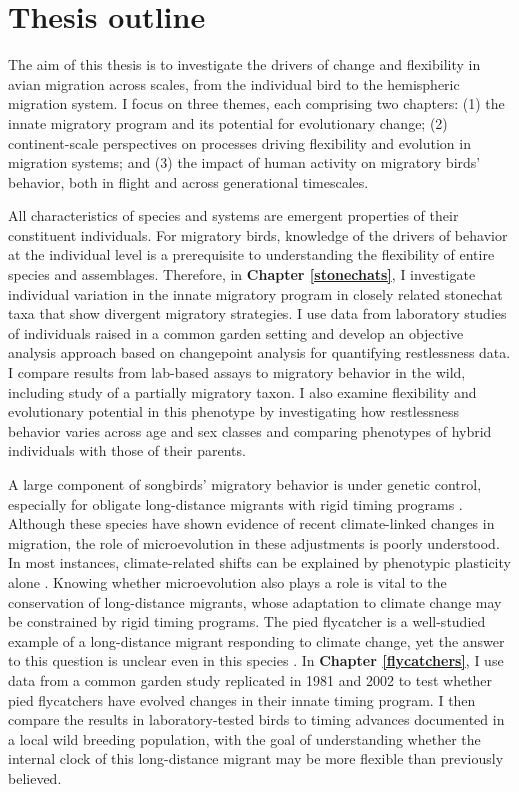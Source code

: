 \documentclass[a4paper, nobind]{templates/ociamthesis}
\begin{document}
\hypertarget{thesis-outline}{%
\section*{Thesis outline}\label{thesis-outline}}

The aim of this thesis is to investigate the drivers of change and flexibility in avian migration across scales, from the individual bird to the hemispheric migration system. I focus on three themes, each comprising two chapters: (1) the innate migratory program and its potential for evolutionary change; (2) continent-scale perspectives on processes driving flexibility and evolution in migration systems; and (3) the impact of human activity on migratory birds' behavior, both in flight and across generational timescales.

All characteristics of species and systems are emergent properties of their constituent individuals. For migratory birds, knowledge of the drivers of behavior at the individual level is a prerequisite to understanding the flexibility of entire species and assemblages. Therefore, in \textbf{Chapter \ref{stonechats}}, I investigate individual variation in the innate migratory program in closely related stonechat taxa that show divergent migratory strategies. I use data from laboratory studies of individuals raised in a common garden setting and develop an objective analysis approach based on changepoint analysis for quantifying restlessness data. I compare results from lab-based assays to migratory behavior in the wild, including study of a partially migratory taxon. I also examine flexibility and evolutionary potential in this phenotype by investigating how restlessness behavior varies across age and sex classes and comparing phenotypes of hybrid individuals with those of their parents.

A large component of songbirds' migratory behavior is under genetic control, especially for obligate long-distance migrants with rigid timing programs \autocite{liedvogelGeneticsMigration2014}. Although these species have shown evidence of recent climate-linked changes in migration, the role of microevolution in these adjustments is poorly understood. In most instances, climate-related shifts can be explained by phenotypic plasticity alone \autocite{charmantierClimateChangeTiming2014}. Knowing whether microevolution also plays a role is vital to the conservation of long-distance migrants, whose adaptation to climate change may be constrained by rigid timing programs. The pied flycatcher is a well-studied example of a long-distance migrant responding to climate change, yet the answer to this question is unclear even in this species \autocite{bothFlexibilityTimingAvian2010}. In \textbf{Chapter \ref{flycatchers}}, I use data from a common garden study replicated in 1981 and 2002 to test whether pied flycatchers have evolved changes in their innate timing program. I then compare the results in laboratory-tested birds to timing advances documented in a local wild breeding population, with the goal of understanding whether the internal clock of this long-distance migrant may be more flexible than previously believed.
\end{document}
